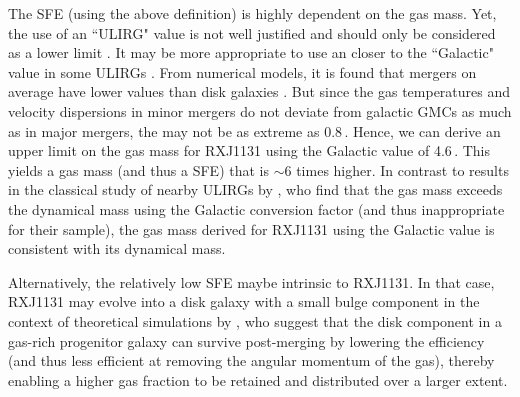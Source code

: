 \documentclass[]{emulateapj}
\begin{document}
The SFE (using the above definition) is highly dependent on the gas mass.
Yet, the use of an ``ULIRG" \alphaco value is not well justified and 
should only be considered as a lower limit .
It may be more appropriate to use an \alphaco closer to the ``Galactic" value in 
some ULIRGs \citep[\eg][]{Papadopoulos12a}. 
From numerical models, it is found that mergers on average have lower \alphaco values than
disk galaxies \citep{Narayanan12a}.
But since the gas temperatures and velocity dispersions in minor mergers do not deviate from 
galactic GMCs as much as in major mergers, the \alphaco may not be as extreme as 0.8\,\alphaU.
Hence,
we can derive an upper limit on the gas mass for RXJ1131 
using the Galactic value of 4.6\,\alphaU. This yields
a gas mass (and thus a SFE) that is $\sim$6 times higher.  
In contrast to results in the classical study of nearby ULIRGs by , who find that
the gas mass exceeds the dynamical mass using 
the Galactic conversion factor 
(and thus inappropriate for their sample), the gas mass derived for
RXJ1131 using the Galactic value is consistent with its dynamical mass.

Alternatively, the relatively low SFE maybe intrinsic to RXJ1131.
In that case,  RXJ1131 may evolve into a disk galaxy with a small bulge component
in the context of theoretical simulations by \citet{Hopkins09a}, who suggest 
that the disk component in a gas-rich progenitor galaxy can survive post-merging
by lowering the \SF efficiency (and thus less efficient at removing the angular momentum of
the gas), thereby enabling a higher gas fraction to be retained and 
distributed over a larger extent.
%
 
\end{document}
